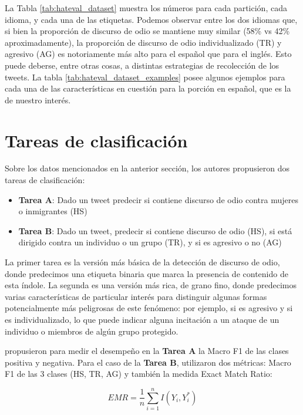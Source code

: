La Tabla \ref{tab:hateval_dataset} muestra los números para cada partición, cada idioma, y cada una de las etiquetas. Podemos observar entre los dos idiomas que, si bien la proporción de discurso de odio se mantiene muy similar (58\% vs 42\% aproximadamente), la proporción de discurso de odio individualizado (TR) y agresivo (AG) es notoriamente más alto para el español que para el inglés. Esto puede deberse, entre otras cosas, a distintas estrategias de recolección de los tweets. La tabla \ref{tab:hateval_dataset_examples} posee algunos ejemplos para cada una de las características en cuestión para la porción en español, que es la de nuestro interés.

\section{Tareas de clasificación}

Sobre los datos mencionados en la anterior sección, los autores propusieron dos tareas de clasificación:

\newcommand{\subtaska}[0]{\textbf{Tarea A}}
\newcommand{\subtaskb}[0]{\textbf{Tarea B}}

\begin{itemize}
    \item \subtaska{}: Dado un tweet predecir si contiene discurso de odio contra mujeres o inmigrantes (HS)
    \item \subtaskb{}: Dado un tweet, predecir si contiene discurso de odio (HS), si está dirigido contra un individuo o un grupo (TR), y si es agresivo o no (AG)
\end{itemize}


La primer tarea es la versión más básica de la detección de discurso de odio, donde predecimos una etiqueta binaria que marca la presencia de contenido de esta índole. La segunda es una versión más rica, de grano fino, donde predecimos varias características de particular interés para distinguir algunas formas potencialmente más peligrosas de este fenómeno: por ejemplo, si es agresivo y si es individualizado, lo que puede indicar alguna incitación a un ataque de un individuo o miembros de algún grupo protegido.

\citet{hateval2019semeval} propusieron para medir el desempeño en la \subtaska{} la Macro F1 de las clases positiva y negativa. Para el caso de la \subtaskb{}, utilizaron dos métricas: Macro F1 de las 3 clases (HS, TR, AG) y también la medida Exact Match Ratio:

\begin{equation*}
    EMR = \frac{1}{n} \sum\limits_{i=1}^{n} I(Y_i, Y_i^*)
\end{equation*}

